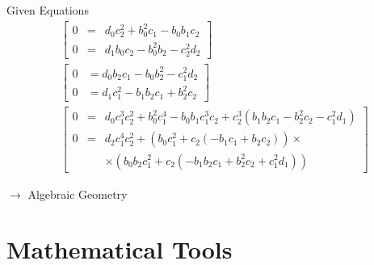 \documentclass[notes=hide]{beamer}
\begin{document}
\begin{frame}{Given Equations}
\begin{align*}
& \begin{bmatrix}
0&=& d_0 c_2^2 + b_0^2 c_1 - b_0 b_1 c_2\\
0&=&d_1 b_0 c_2 - b_0^2 b_2-c_2^2 d_2
\end{bmatrix}\\
& \begin{bmatrix}
0&=d_0 b_2 c_1 - b_0 b_2^2 - c_1^2 d_2\\
0&=d_1 c_1^2 - b_1 b_2 c_1 + b_2^2 c_2
\end{bmatrix}\\
& \begin{bmatrix}
0&=&d_0 c_1^3 c_2^2 + b_0^2 c_1^4-b_0 b_1 c_1^3 c_2 + c_2^3 (b_1 b_2 c_1 - b_2^2 c_2 - c_1^2 d_1)\\
0&=&d_2 c_1^4 c_2^2+(b_0 c_1^2+c_2 (-b_1 c_1+b_2 c_2)) \times \\
& &\times (b_0 b_2 c_1^2+c_2 (-b_1 b_2 c_1+b_2^2 c_2+c_1^2 d_1))
\end{bmatrix}
\end{align*}
\vspace{1em}
\pause
\begin{center}
$\rightarrow$ Algebraic Geometry
\end{center}

\end{frame}
 
\section{Mathematical Tools}
\end{document}
